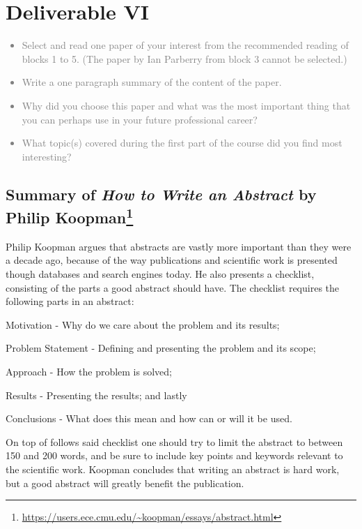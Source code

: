 \chapter{Deliverable VI}
\textcolor{gray}{%
\begin{itemize}
    \item Select and read one paper of your interest from the recommended reading of blocks 1 to 5. (The paper by Ian Parberry from block 3 cannot be selected.)
    \item Write a one paragraph summary of the content of the paper.
    \item Why did you choose this paper and what was the most important thing that you can perhaps use in your future professional career?
    \item What topic(s) covered during the first part of the course did you find most interesting?
\end{itemize}}

\section{Summary of \textit{How to Write an Abstract} by Philip Koopman\footnote{\url{https://users.ece.cmu.edu/~koopman/essays/abstract.html}}}
Philip Koopman argues that abstracts are vastly more important than they were a decade ago, because of the way publications and scientific work is presented though databases and search engines today.
He also presents a checklist, consisting of the parts a good abstract should have.
The checklist requires the following parts in an abstract:
\begin{enumerate*}
    \item Motivation - Why do we care about the problem and its results;
    \item Problem Statement - Defining and presenting the problem and its scope;
    \item Approach - How the problem is solved;
    \item Results - Presenting the results; and lastly
    \item Conclusions - What does this mean and how can or will it be used.
\end{enumerate*}
On top of follows said checklist one should try to limit the abstract to between 150 and 200 words, and be sure to include key points and keywords relevant to the scientific work.
Koopman concludes that writing an abstract is hard work, but a good abstract will greatly benefit the publication.

